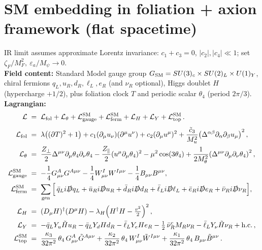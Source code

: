 \documentclass[preview]{standalone}
\begin{document}
\section*{SM embedding in foliation + axion framework (flat spacetime)}
\noindent
IR limit assumes approximate Lorentz invariance: $c_1 + c_3 \!=\! 0$, $|c_2|,|c_4|\!\ll\!1$; set $\zeta_F/M_F^2,\ \varepsilon_a/M_\psi \to 0$.
\\[4pt]
\textbf{Field content:} Standard Model gauge group $G_{\rm SM}=SU(3)_c\times SU(2)_L\times U(1)_Y$, chiral fermions $q_L,u_R,d_R,\ell_L,e_R$ (and $\nu_R$ optional), Higgs doublet $H$ (hypercharge $+1/2$), plus foliation clock $T$ and periodic scalar $\theta_4$ (period $2\pi/3$).
\\[6pt]
\textbf{Lagrangian:}
\begin{align}
\mathcal{L} &\;=\; \mathcal{L}_{\text{fol}} + \mathcal{L}_{\theta} + \mathcal{L}_{\text{gauge}}^{\rm SM} + \mathcal{L}_{\text{ferm}}^{\rm SM} + \mathcal{L}_{H} + \mathcal{L}_{Y} + \mathcal{L}_{\text{top}}^{\rm SM}\,.
\\[4pt]
\mathcal{L}_{\text{fol}} &\;=\; \lambda\!\left((\partial T)^2+1\right)
+ c_1(\partial_\mu u_\nu)(\partial^\mu u^\nu)
+ c_2(\partial_\mu u^\mu)^2
+ \frac{\tilde c_3}{M_u^2}\!\left(\Delta^{\alpha\beta}\partial_\alpha\partial_\beta u_\mu\right)^2 ,
\\
\mathcal{L}_{\theta} &\;=\; \frac{Z_\perp}{2}\Delta^{\mu\nu}\partial_\mu\theta_4\partial_\nu\theta_4
- \frac{Z_\parallel}{2}(u^\mu\partial_\mu\theta_4)^2
- \mu^2\cos(3\theta_4)
+ \frac{1}{2M_\theta^2}\!\left(\Delta^{\mu\nu}\partial_\mu\partial_\nu\theta_4\right)^2 ,
\\
\mathcal{L}_{\text{gauge}}^{\rm SM} &\;=\; -\frac14 G^A_{\mu\nu}G^{A\mu\nu}
- \frac14 W^I_{\mu\nu}W^{I\mu\nu}
- \frac14 B_{\mu\nu}B^{\mu\nu},
\\
\mathcal{L}_{\text{ferm}}^{\rm SM} &\;=\; \sum_{\text{gen}}\Big[\,
\bar q_L i\slashed{D} q_L + \bar u_R i\slashed{D} u_R + \bar d_R i\slashed{D} d_R
+ \bar\ell_L i\slashed{D} \ell_L + \bar e_R i\slashed{D} e_R
+ \bar\nu_R i\slashed{D}\nu_R \Big] ,
\\
\mathcal{L}_H &\;=\; (D_\mu H)^\dagger(D^\mu H) - \lambda_H\!\left(H^\dagger H - \tfrac{v^2}{2}\right)^2 ,
\\
\mathcal{L}_Y &\;=\; - \bar q_L Y_u \tilde H u_R - \bar q_L Y_d H d_R - \bar \ell_L Y_e H e_R
- \tfrac12\, \bar \nu_R^c M_R \nu_R - \bar \ell_L Y_\nu \tilde H \nu_R + \text{h.c.}\,,
\\
\mathcal{L}_{\text{top}}^{\rm SM} &\;=\; \frac{\kappa_3}{32\pi^2}\,\theta_4\, G^A_{\mu\nu}\tilde G^{A\mu\nu}
+ \frac{\kappa_2}{32\pi^2}\,\theta_4\, W^I_{\mu\nu}\tilde W^{I\mu\nu}
+ \frac{\kappa_1}{32\pi^2}\,\theta_4\, B_{\mu\nu}\tilde B^{\mu\nu}\,.
\end{align}
\end{document}

